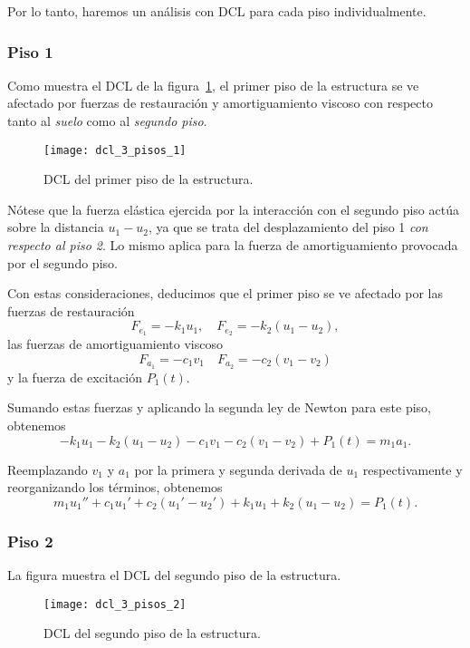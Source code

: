 Por lo tanto, haremos un análisis con DCL para cada piso individualmente.

\subsubsection*{Piso 1}

Como muestra el DCL de la figura~\ref{fig:3-floor-dcl-1}, el primer piso de la estructura se ve afectado por fuerzas de restauración y amortiguamiento viscoso con respecto tanto al \textit{suelo} como al \textit{segundo piso}.

\begin{figure}[ht!]
    \centering
    \texttt{[image: dcl\_3\_pisos\_1]}
    \caption{DCL del primer piso de la estructura.}
    \label{fig:3-floor-dcl-1}
\end{figure}

Nótese que la fuerza elástica ejercida por la interacción con el segundo piso actúa sobre la distancia \(u_1 - u_2\), ya que se trata del desplazamiento del piso 1 \textit{con respecto al piso 2}. Lo mismo aplica para la fuerza de amortiguamiento provocada por el segundo piso.

Con estas consideraciones, deducimos que el primer piso se ve afectado por las fuerzas de restauración
\[
    F_{e_1} = -k_1 u_1, \quad F_{e_2} = -k_2(u_1 - u_2)
,\]
las fuerzas de amortiguamiento viscoso
\[
    F_{a_1} = -c_1 v_1 \quad F_{a_2} = -c_2(v_1 - v_2)
\]
y la fuerza de excitación \(P_1(t)\).

Sumando estas fuerzas y aplicando la segunda ley de Newton para este piso, obtenemos
\[
    -k_1 u_1 - k_2(u_1 - u_2) - c_1 v_1 - c_2(v_1 - v_2) + P_1(t) = m_1 a_1
.\]

Reemplazando \(v_1\) y \(a_1\) por la primera y segunda derivada de \(u_1\) respectivamente y reorganizando los términos, obtenemos
\begin{equation}\label{eqn:floor-1}
    m_1 u_1'' + c_1 u_1' + c_2(u_1' - u_2') + k_1 u_1 + k_2(u_1 - u_2) = P_1(t)
.\end{equation}


\subsubsection*{Piso 2}

La figura  muestra el DCL del segundo piso de la estructura.

\begin{figure}[ht!]
    \centering
    \texttt{[image: dcl\_3\_pisos\_2]}
    \caption{DCL del segundo piso de la estructura.}
    \label{fig:3-floor-dcl-2}
\end{figure}

